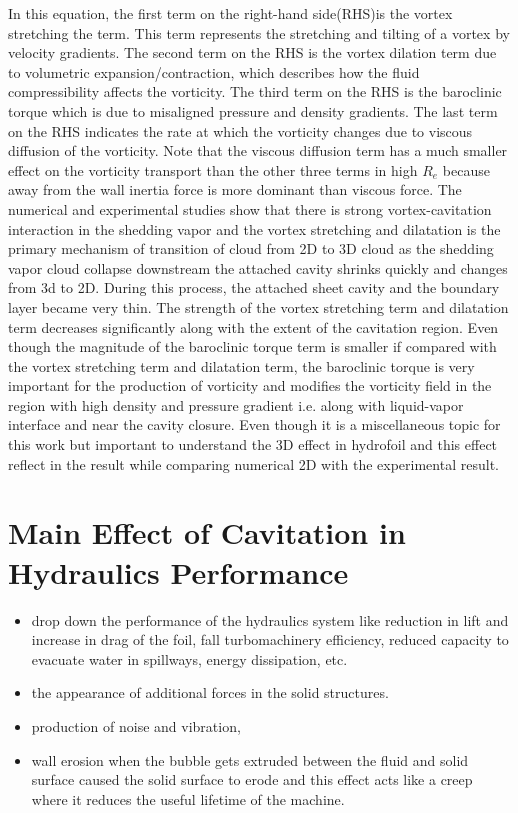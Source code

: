 In this equation, the first term on the right-hand side(RHS)is the
vortex stretching the term. This term represents the stretching and
tilting of a vortex by velocity gradients. The second term on the RHS
is the vortex dilation term due to volumetric expansion/contraction,
which describes how the fluid compressibility affects the
vorticity. The third term on the RHS is the baroclinic torque which is
due to misaligned pressure and density gradients. The last term on the
RHS indicates the rate at which the vorticity changes due to viscous
diffusion of the vorticity. Note that the viscous diffusion term has a
much smaller effect on the vorticity transport than the other three
terms in high $R_e$ because away from the wall inertia force is more
dominant than viscous force. The numerical and experimental studies
show that there is strong vortex-cavitation interaction in the
shedding vapor and the vortex stretching and dilatation is the primary
mechanism of transition of cloud from 2D to 3D cloud as the shedding
vapor cloud collapse downstream the attached cavity shrinks quickly
and changes from 3d to 2D. During this process, the attached sheet
cavity and the boundary layer became very thin. The strength of the
vortex stretching term and dilatation term decreases significantly
along with the extent of the cavitation region. Even though the
magnitude of the baroclinic torque term is smaller if compared with
the vortex stretching term and dilatation term, the baroclinic torque
is very important for the production of vorticity and modifies the
vorticity field in the region with high density and pressure gradient
i.e. along with liquid-vapor interface and near the cavity
closure. Even though it is a miscellaneous topic for this work but
important to understand the 3D effect in hydrofoil and this effect
reflect in the result while comparing numerical 2D with the
experimental result.

\section{Main Effect of Cavitation in Hydraulics Performance}
\begin{itemize}
\item drop down the performance of the hydraulics system like
  reduction in lift and increase in drag of the foil, fall
  turbomachinery efficiency, reduced capacity to evacuate water in
  spillways, energy dissipation, etc.
\item the appearance of additional forces in the solid structures.
\item production of noise and vibration,
\item wall erosion when the bubble gets extruded between the fluid and
  solid surface caused the solid surface to erode and this effect acts
  like a creep where it reduces the useful lifetime of the machine.
\end{itemize}
